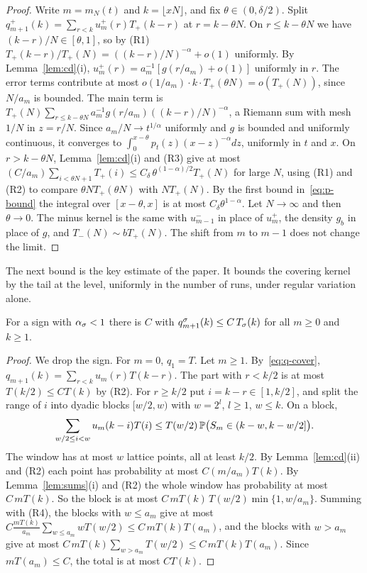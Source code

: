 \begin{proof}
Write $m=m_N(t)$ and $k=\lfloor xN\rfloor$, and fix $\theta\in(0,\delta/2)$. Split
$q^\plus_{m+1}(k)=\sum_{r<k}u^\plus_m(r)T_\plus(k-r)$ at $r=k-\theta N$. On
$r\le k-\theta N$ we have $(k-r)/N\in[\theta,1]$, so by (R1)
$T_\plus(k-r)/T_\plus(N)=((k-r)/N)^{-\alpha}+o(1)$ uniformly. By
Lemma~\ref{lem:cd}(i), $u^\plus_m(r)=a_m^{-1}[g(r/a_m)+o(1)]$ uniformly in $r$. The error
terms contribute at most $o(1/a_m)\cdot k\cdot T_\plus(\theta N)=o(T_\plus(N))$, since
$N/a_m$ is bounded. The main term is
$T_\plus(N)\sum_{r\le k-\theta N}a_m^{-1}g(r/a_m)((k-r)/N)^{-\alpha}$, a Riemann sum with mesh
$1/N$ in $z=r/N$. Since $a_m/N\to t^{1/\alpha}$ uniformly and $g$ is bounded and uniformly
continuous, it converges to $\int_0^{x-\theta}p_t(z)(x-z)^{-\alpha}dz$, uniformly in
$t$ and $x$. On $r>k-\theta N$, Lemma~\ref{lem:cd}(i) and (R3) give at most
$(C/a_m)\sum_{i<\theta N+1}T_\plus(i)\le C_\delta\,\theta^{(1-\alpha)/2}T_\plus(N)$ for large
$N$, using (R1) and (R2) to compare $\theta NT_\plus(\theta N)$ with $NT_\plus(N)$. By the
first bound in~\eqref{eq:p-bound} the integral over $[x-\theta,x]$ is at most
$C_\delta\theta^{1-\alpha}$. Let $N\to\infty$ and then $\theta\to0$. The minus kernel is the
same with $u^\minus_{m-1}$ in place of $u^\plus_m$, the density $g_b$ in place of $g$,
and $T_\minus(N)\sim bT_\plus(N)$. The shift from $m$ to $m-1$ does not change the
limit.
\end{proof}

The next bound is the key estimate of the paper. It bounds the covering kernel by
the tail at the level, uniformly in the number of runs, under regular variation
alone.

\begin{lemma}\label{lem:key}
For a sign with $\alpha_\sigma<1$ there is $C$ with $q^\sigma_{m+1}(k)\le C\,T_\sigma(k)$ for all
$m\ge0$ and $k\ge1$.
\end{lemma}

\begin{proof}
We drop the sign. For $m=0$, $q_1=T$. Let $m\ge1$. By~\eqref{eq:q-cover},
$q_{m+1}(k)=\sum_{r<k}u_m(r)T(k-r)$. The part with $r<k/2$ is at most
$T(k/2)\le CT(k)$ by (R2). For $r\ge k/2$ put $i=k-r\in[1,k/2]$, and split the range
of $i$ into dyadic blocks $[w/2,w)$ with $w=2^l$, $l\ge1$, $w\le k$. On a block,
\[
 \sum_{w/2\le i<w}u_m(k-i)T(i)\le T(w/2)\,\mathbb{P}\bigl(S_m\in(k-w,k-w/2]\bigr).
\]
The window has at most $w$ lattice points, all at least $k/2$. By
Lemma~\ref{lem:cd}(ii) and (R2) each point has probability at most
$C(m/a_m)T(k)$. By Lemma~\ref{lem:sums}(i) and (R2) the whole window has probability
at most $C\,mT(k)$. So the block is at most
$C\,mT(k)\,T(w/2)\min\{1,w/a_m\}$. Summing with (R4), the blocks with $w\le a_m$ give
at most $C\frac{mT(k)}{a_m}\sum_{w\le a_m}wT(w/2)\le C\,mT(k)T(a_m)$, and the blocks
with $w>a_m$ give at most $C\,mT(k)\sum_{w>a_m}T(w/2)\le C\,mT(k)T(a_m)$. Since
$mT(a_m)\le C$, the total is at most $CT(k)$.
\end{proof}

